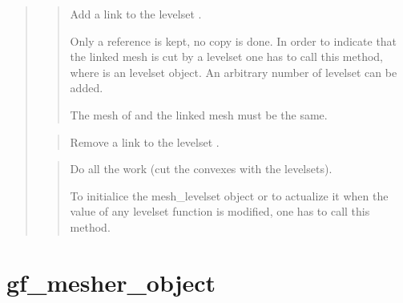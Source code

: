\documentclass[a4paper,11pt,english]{sphinxmanual}
\begin{document}
\begin{quote}

\begin{quote}

Add a link to the levelset .

Only a reference is kept, no copy is done. In order to indicate
that the linked mesh is cut by a levelset one has to call this
method, where  is an levelset object. An arbitrary number of
levelset can be added.


The mesh of  and the linked mesh must be the same.
\end{quote}

\begin{quote}

Remove a link to the levelset .
\end{quote}

\begin{quote}

Do all the work (cut the convexes with the levelsets).

To initialice the mesh\_levelset object or to actualize it when the
value of any levelset function is modified, one has to call
this method.
\end{quote}
\end{quote}


\section{gf\_mesher\_object}
\label{\detokenize{matlab_octave/cmdref_gf_mesher_object:gf-mesher-object}}\label{\detokenize{matlab_octave/cmdref_gf_mesher_object::doc}}
\end{document}

